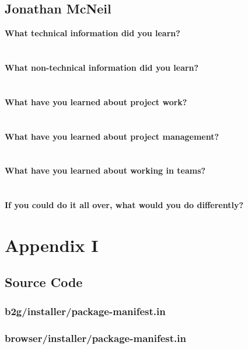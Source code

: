 \documentclass[12pt]{article}
\begin{document}
\subsection{Jonathan McNeil}
\textbf{What technical information did you learn?}\\
\\\\
\textbf{What non-technical information did you learn?}\\
\\\\
\textbf{What have you learned about project work?}\\
\\\\
\textbf{What have you learned about project management?}\\
\\\\
\textbf{What have you learned about working in teams?}\\
\\\\
\textbf{If you could do it all over, what would you do differently?}\\
\pagebreak

\section{Appendix I}
\subsection{Source Code}

\subsubsection{b2g/installer/package-manifest.in}

\pagebreak

\subsubsection{browser/installer/package-manifest.in}

\pagebreak
\end{document}
